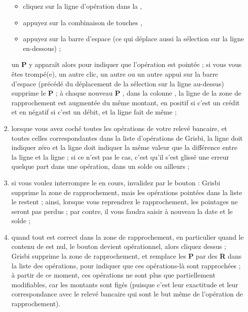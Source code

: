 \begin{enumerate}
		\begin{itemize}
			\item cliquez sur la ligne d'opération dans la  ,
			\item appuyez sur la  combinaison de touches ,
			\item appuyez sur la barre d'espace (ce qui déplace aussi la sélection sur la ligne en-dessous) ;			
		\end{itemize}	 
un \og \textbf{P} \fg{} y apparaît alors pour indiquer que l'opération est \og pointée \fg{} ; si vous vous êtes trompé(e), un autre clic, un autre  ou un autre appui sur la barre d'espace (précédé du déplacement de la sélection sur la ligne au-dessus) supprime le \og \textbf{P} \fg{} ; à chaque nouveau \og \textbf{P} \fg{}, dans la colonne , la ligne  de la zone de rapprochement est augmentée du même montant, en positif si c'est un crédit et en négatif si c'est un débit, et la ligne  fait de même ;
	 \item lorsque vous avez coché toutes les opérations de votre relevé bancaire, et toutes celles correspondantes dans la liste d'opérations de Grisbi, la ligne 	 doit indiquer zéro et la ligne  doit indiquer la même valeur que la différence entre la ligne  et la ligne  ; si ce n'est pas le cas, c'est qu'il s'est glissé une erreur quelque part dans une opération, dans un solde ou ailleurs ;
	 \item si vous voulez interrompre le  en cours, invalidez par le bouton  : Grisbi supprime la zone de rapprochement, mais les opérations pointées dans la liste le restent ; ainsi, lorsque vous reprendrez le rapprochement, les pointages ne seront pas perdus ; par contre, il vous faudra saisir à nouveau la date et le solde ;
	 \item quand tout est correct dans la zone de rapprochement, en particulier quand le contenu de  est nul, le bouton  devient opérationnel, alors cliquez dessus ; Grisbi supprime la zone de rapprochement, et remplace les \og \textbf{P} \fg{} par des \og \textbf{R} \fg{} dans la liste des opérations, pour indiquer que ces opérations-là sont \og rapprochées \fg{} ; à partir de ce moment, ces opérations ne sont plus que partiellement modifiables, car les montants sont figés (puisque c'est leur exactitude et leur correspondance avec le relevé bancaire qui sont le but même de l'opération de rapprochement).
\end{enumerate}

